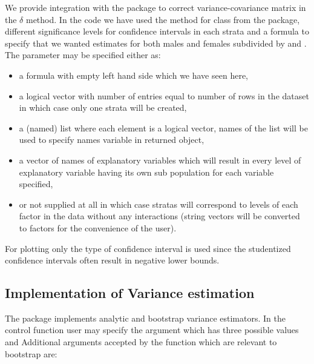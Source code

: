 \documentclass[
]{jss}
\newcommand{\1}{\mathcal{I}} \newcommand{\bZero}{\boldsymbol{0}}
\begin{document}
\normalsize

We provide integration with the  \citep{sandwich} package
to correct variance-covariance matrix in the \(\delta\) method. In the
code we have used the  method for
 class from the  package,
different significance levels for confidence intervals in each strata
and a formula to specify that we wanted estimates for both males and
females subdivided by  and . The 
parameter may be specified either as:

\begin{itemize}
\item a formula with empty left hand side which we have seen here,
\item a logical vector with number of entries equal to number of rows in the dataset in which case only one strata will be created,
\item a (named) list where each element is a logical vector, names of the list will be used to specify names variable in returned object,
\item a vector of names of explanatory variables which will result in every level of explanatory variable having its own sub population for each variable specified,
\item or not supplied at all in which case stratas will correspond to levels of each factor in the data without any interactions (string vectors will be converted to factors for the convenience of the user).
\end{itemize}

For plotting only the  type of confidence interval is
used since the studentized confidence intervals often result in negative
lower bounds.

\subsection{Implementation of Variance
estimation}\label{implementation-of-variance-estimation}

The package implements analytic and bootstrap variance estimators. In
the control function  user may specify the
 argument which has three possible values
 and 
Additional arguments accepted by the  function which
are relevant to bootstrap are:
\end{document}
